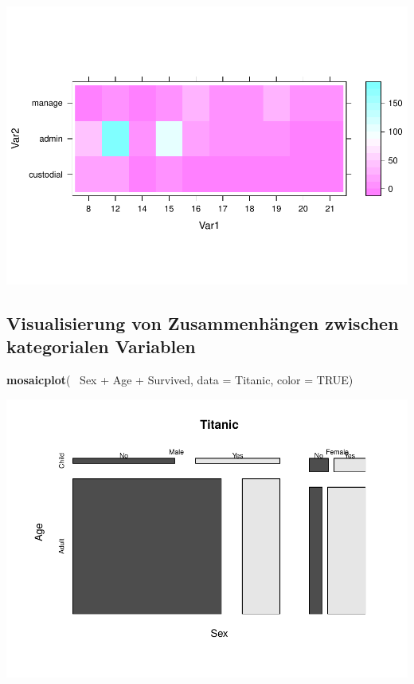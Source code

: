 \documentclass[]{article}
\newenvironment{Shaded}{\begin{snugshade}}{\end{snugshade}}
\newcommand{\KeywordTok}[1]{\textcolor[rgb]{0.13,0.29,0.53}{\textbf{{#1}}}}
\newcommand{\DataTypeTok}[1]{\textcolor[rgb]{0.13,0.29,0.53}{{#1}}}
\newcommand{\StringTok}[1]{\textcolor[rgb]{0.31,0.60,0.02}{{#1}}}
\newcommand{\OtherTok}[1]{\textcolor[rgb]{0.56,0.35,0.01}{{#1}}}
\newcommand{\NormalTok}[1]{{#1}}
\begin{document}
\includegraphics{Intro_Datenanalyse1_files/figure-latex/unnamed-chunk-167-1.pdf}

\subsection{Visualisierung von Zusammenhängen zwischen kategorialen
Variablen}\label{visualisierung-von-zusammenhangen-zwischen-kategorialen-variablen}

\begin{Shaded}
\begin{Highlighting}[]
\KeywordTok{mosaicplot}\NormalTok{(~}\StringTok{ }\NormalTok{Sex +}\StringTok{ }\NormalTok{Age +}\StringTok{ }\NormalTok{Survived, }
           \DataTypeTok{data =} \NormalTok{Titanic, }\DataTypeTok{color =} \OtherTok{TRUE}\NormalTok{)}
\end{Highlighting}
\end{Shaded}

\includegraphics{Intro_Datenanalyse1_files/figure-latex/unnamed-chunk-168-1.pdf}
\end{document}
